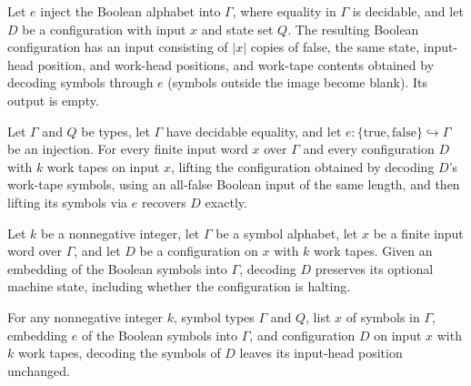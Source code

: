 \begin{definition}
\label{Turing.Cfg.decodeSymbols}
\leanok
{}
Let $e$ inject the Boolean alphabet into $\Gamma$, where equality in $\Gamma$ is
decidable, and let $D$ be a configuration with input $x$ and state set $Q$. The
resulting Boolean configuration has an input consisting of $|x|$ copies of false, the
same state, input-head position, and work-head positions, and work-tape contents
obtained by decoding symbols through $e$ (symbols outside the image become blank). Its
output is empty.
\end{definition}

\begin{theorem}
\label{Turing.Cfg.liftOver_decodeSymbols}
\leanok
{}
Let $\Gamma$ and $Q$ be types, let $\Gamma$ have decidable equality, and let $e :
\{\mathrm{true},\mathrm{false}\} \hookrightarrow \Gamma$ be an injection. For every
finite input word $x$ over $\Gamma$ and every configuration $D$ with $k$ work tapes on
input $x$, lifting the configuration obtained by decoding $D$'s work-tape symbols, using
an all-false Boolean input of the same length, and then lifting its symbols via $e$
recovers $D$ exactly.
\end{theorem}

\begin{theorem}
\label{Turing.Cfg.decodeSymbols_state}
\leanok
{}
Let $k$ be a nonnegative integer, let $\Gamma$ be a symbol alphabet, let $x$ be a finite
input word over $\Gamma$, and let $D$ be a configuration on $x$ with $k$ work tapes.
Given an embedding of the Boolean symbols into $\Gamma$, decoding $D$ preserves its
optional machine state, including whether the configuration is halting.
\end{theorem}

\begin{theorem}
\label{Turing.Cfg.decodeSymbols_inputPos}
\leanok
{}
For any nonnegative integer $k$, symbol types $\Gamma$ and $Q$, list $x$ of symbols in
$\Gamma$, embedding $e$ of the Boolean symbols into $\Gamma$, and configuration $D$ on
input $x$ with $k$ work tapes, decoding the symbols of $D$ leaves its input-head
position unchanged.
\end{theorem}

